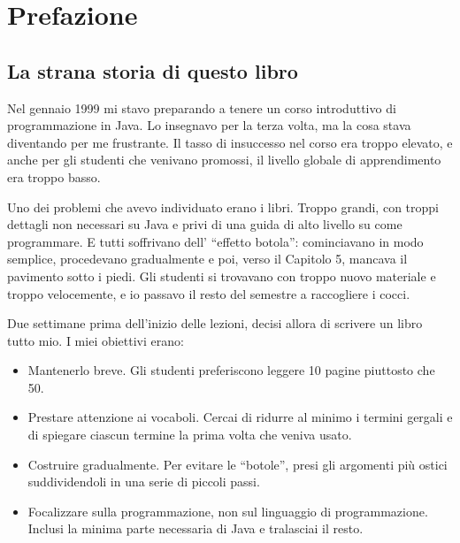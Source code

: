 \documentclass[10pt]{book}
\begin{document}
\fi


\chapter{Prefazione}

\section*{La strana storia di questo libro}

Nel gennaio 1999 mi stavo preparando a tenere un corso introduttivo di programmazione in Java. Lo insegnavo per la terza volta, ma la cosa stava diventando per me frustrante. Il tasso di insuccesso nel corso era troppo elevato, e anche per gli studenti che venivano promossi, il livello globale di apprendimento era troppo basso.

Uno dei problemi che avevo individuato erano i libri. Troppo grandi, con troppi dettagli non necessari su Java e privi di una guida di alto livello su come programmare. E tutti soffrivano dell' ``effetto botola'': cominciavano in modo semplice, procedevano gradualmente e poi, verso il Capitolo 5, mancava il pavimento sotto i piedi. Gli studenti si trovavano con troppo nuovo materiale e troppo velocemente, e io passavo il resto del semestre a raccogliere i cocci.

Due settimane prima dell'inizio delle lezioni, decisi allora di scrivere un libro tutto mio. I miei obiettivi erano:

\begin{itemize}

\item Mantenerlo breve. Gli studenti preferiscono leggere 10 pagine piuttosto che 50.

\item Prestare attenzione ai vocaboli. Cercai di ridurre al minimo i termini gergali e di spiegare ciascun termine la prima volta che veniva usato.

\item Costruire gradualmente. Per evitare le ``botole'', presi gli argomenti più ostici suddividendoli in una serie di piccoli passi.

\item Focalizzare sulla programmazione, non sul linguaggio di programmazione. Inclusi la minima parte necessaria di Java e tralasciai il resto.

\end{itemize}
\end{document}
